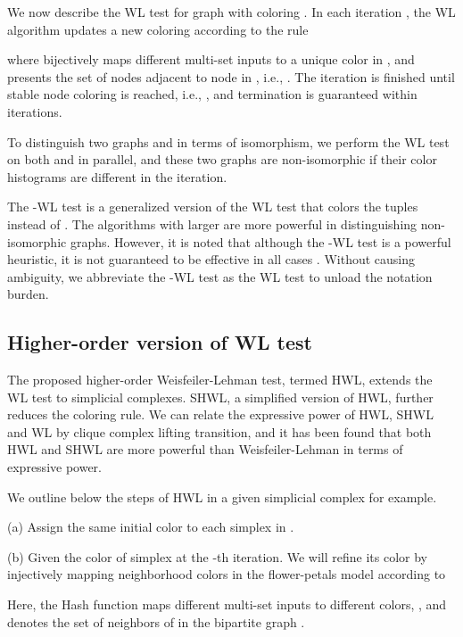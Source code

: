 \documentclass[letterpaper]{article} \usepackage{aaai24}
\theoremstyle{plain}
\theoremstyle{definition}
\theoremstyle{remark}
\begin{document}
We now describe the WL test for graph  with coloring .  In each iteration , the WL algorithm updates a new coloring according to the rule

where  bijectively maps different multi-set inputs  to a unique color in , and  presents the set of nodes adjacent to node  in , i.e., . The iteration is finished until stable node coloring is reached, i.e., , and termination is guaranteed within  iterations.

To distinguish two graphs  and  in terms of isomorphism, we perform the WL test on both  and  in parallel, and these two graphs are non-isomorphic if their color histograms are different in the iteration.




The -WL test  is a generalized version of the WL test that colors the tuples  instead of . The algorithms with larger  are more powerful in distinguishing non-isomorphic graphs. However, it is noted that although the -WL test is a powerful heuristic, it is not guaranteed to be effective in all cases \cite{CFI1992}. Without causing ambiguity,  we abbreviate the -WL test as the WL test to unload the notation burden.




\subsection{Higher-order version of WL test}
\label{appendix:HWL_SHWL}

The proposed higher-order Weisfeiler-Lehman test, termed HWL, extends the WL test to simplicial complexes. 
SHWL, a simplified version of HWL, further reduces the coloring rule.
We can relate the expressive power of HWL, SHWL and WL by clique complex lifting transition, and it has been found that both HWL and SHWL are more powerful than Weisfeiler-Lehman in terms of expressive power.



We outline below the steps of HWL in a given simplicial complex  for example.

(a) Assign the same initial color  to each simplex  in .

(b) Given the color   of simplex  at the -th iteration. We will refine its color by injectively mapping neighborhood colors in the flower-petals model according to

Here, the Hash function maps different multi-set inputs to different colors, , and  denotes the set of neighbors of  in the bipartite graph .
\end{document}
